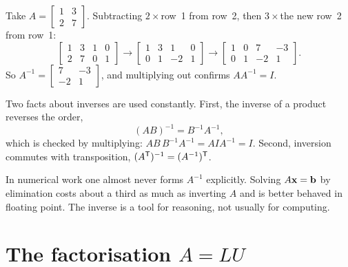 \begin{example}
Take \(A=\begin{bmatrix}1&3\\2&7\end{bmatrix}\). Subtracting \(2\times\)row~1
from row~2, then \(3\times\)the new row~2 from row~1:
\[
	\left[\begin{array}{cc|cc}1&3&1&0\\2&7&0&1\end{array}\right]
	\rightarrow
	\left[\begin{array}{cc|cc}1&3&1&0\\0&1&-2&1\end{array}\right]
	\rightarrow
	\left[\begin{array}{cc|cc}1&0&7&-3\\0&1&-2&1\end{array}\right].
\]
So \(A^{-1}=\begin{bmatrix}7&-3\\-2&1\end{bmatrix}\), and multiplying out
confirms \(AA^{-1}=I\).
\end{example}


Two facts about inverses are used constantly. First, the inverse of a product
reverses the order,
\[
	(AB)^{-1}=B^{-1}A^{-1},
\]
which is checked by multiplying: \(AB\,B^{-1}A^{-1}=AIA^{-1}=I\). Second,
inversion commutes with transposition, \((A^{\mathsf{T}})^{-1}=(A^{-1})^{\mathsf{T}}\).

\begin{remark}
In numerical work one almost never forms \(A^{-1}\) explicitly. Solving
\(A\mathbf{x}=\mathbf{b}\) by elimination costs about a third as much as inverting
\(A\) and is better behaved in floating point. The inverse is a tool for
reasoning, not usually for computing.
\end{remark}

\section{The factorisation \texorpdfstring{\(A=LU\)}{A=LU}}

